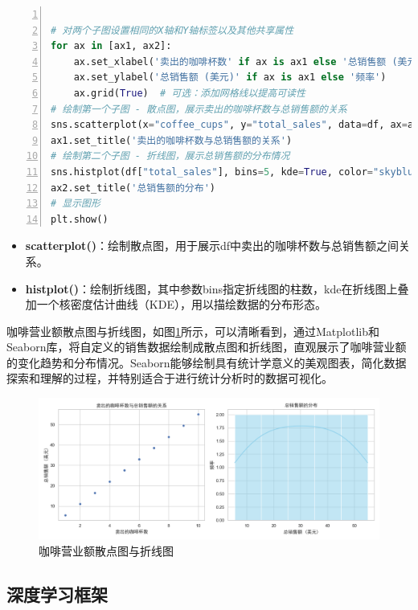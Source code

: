 \begin{lstlisting}[language={python},label={Seaborn简单操作2},caption={Seaborn简单操作2}, basicstyle=\footnotesize\ttfamily, breaklines=true, numbers=left, frame=single]

# 对两个子图设置相同的X轴和Y轴标签以及其他共享属性
for ax in [ax1, ax2]:
    ax.set_xlabel('卖出的咖啡杯数' if ax is ax1 else '总销售额 (美元)')
    ax.set_ylabel('总销售额 (美元)' if ax is ax1 else '频率')
    ax.grid(True)  # 可选：添加网格线以提高可读性
# 绘制第一个子图 - 散点图，展示卖出的咖啡杯数与总销售额的关系
sns.scatterplot(x="coffee_cups", y="total_sales", data=df, ax=ax1)
ax1.set_title('卖出的咖啡杯数与总销售额的关系')
# 绘制第二个子图 - 折线图，展示总销售额的分布情况
sns.histplot(df["total_sales"], bins=5, kde=True, color="skyblue", ax=ax2)
ax2.set_title('总销售额的分布')
# 显示图形
plt.show()

\end{lstlisting}
\begin{itemize}
    \item \textbf{scatterplot()}：绘制散点图，用于展示df中卖出的咖啡杯数与总销售额之间关系。
    \item \textbf{histplot()}：绘制折线图，其中参数bins指定折线图的柱数，kde在折线图上叠加一个核密度估计曲线（KDE），用以描绘数据的分布形态。
\end{itemize}
咖啡营业额散点图与折线图，如图\ref{fig:咖啡营业}所示，可以清晰看到，通过Matplotlib和Seaborn库，将自定义的销售数据绘制成散点图和折线图，直观展示了咖啡营业额的变化趋势和分布情况。Seaborn能够绘制具有统计学意义的美观图表，简化数据探索和理解的过程，并特别适合于进行统计分析时的数据可视化。

\begin{figure}[H]
    \centering
    \includegraphics[width=0.8\linewidth]{image/6/咖啡营业.png}
    \caption{咖啡营业额散点图与折线图}
    \label{fig:咖啡营业}
\end{figure}

\subsection{深度学习框架}

